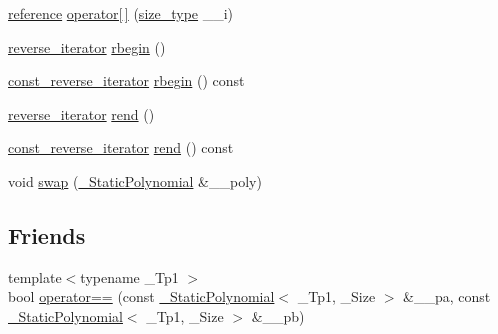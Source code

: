 \begin{DoxyCompactItemize}
\item 
\hyperlink{class____gnu__cxx_1_1__StaticPolynomial_a2416b66d254edf3e7118a8fb1204403f}{reference} \hyperlink{class____gnu__cxx_1_1__StaticPolynomial_ae898e5bc7bfb0e2c3a2e55ab873e80a7}{operator\mbox{[}$\,$\mbox{]}} (\hyperlink{class____gnu__cxx_1_1__StaticPolynomial_a0cc0aa4adab35686ef2474e07f511ff9}{size\+\_\+type} \+\_\+\+\_\+i)
\item 
\hyperlink{class____gnu__cxx_1_1__StaticPolynomial_a6313ff2d9e03c7911016595440c6a2ae}{reverse\+\_\+iterator} \hyperlink{class____gnu__cxx_1_1__StaticPolynomial_ad26b5676e30705aae3ff051f149e52df}{rbegin} ()
\item 
\hyperlink{class____gnu__cxx_1_1__StaticPolynomial_ae59b7bc5bdf7c61e562e8c4c8eaf904d}{const\+\_\+reverse\+\_\+iterator} \hyperlink{class____gnu__cxx_1_1__StaticPolynomial_a53306b159074b3eec382432137a4d297}{rbegin} () const
\item 
\hyperlink{class____gnu__cxx_1_1__StaticPolynomial_a6313ff2d9e03c7911016595440c6a2ae}{reverse\+\_\+iterator} \hyperlink{class____gnu__cxx_1_1__StaticPolynomial_a5f3ae3de860401093c3bbf768218db70}{rend} ()
\item 
\hyperlink{class____gnu__cxx_1_1__StaticPolynomial_ae59b7bc5bdf7c61e562e8c4c8eaf904d}{const\+\_\+reverse\+\_\+iterator} \hyperlink{class____gnu__cxx_1_1__StaticPolynomial_ad39f8cb28001cdfa18776c50160c5ce7}{rend} () const
\item 
void \hyperlink{class____gnu__cxx_1_1__StaticPolynomial_ae855be318bb050b83769beda4df280ec}{swap} (\hyperlink{class____gnu__cxx_1_1__StaticPolynomial}{\+\_\+\+Static\+Polynomial} \&\+\_\+\+\_\+poly)
\end{DoxyCompactItemize}
\subsection*{Friends}
\begin{DoxyCompactItemize}
\item 
{\footnotesize template$<$typename \+\_\+\+Tp1 $>$ }\\bool \hyperlink{class____gnu__cxx_1_1__StaticPolynomial_a851635a09c4301d11b439bfbb192df3a}{operator==} (const \hyperlink{class____gnu__cxx_1_1__StaticPolynomial}{\+\_\+\+Static\+Polynomial}$<$ \+\_\+\+Tp1, \+\_\+\+Size $>$ \&\+\_\+\+\_\+pa, const \hyperlink{class____gnu__cxx_1_1__StaticPolynomial}{\+\_\+\+Static\+Polynomial}$<$ \+\_\+\+Tp1, \+\_\+\+Size $>$ \&\+\_\+\+\_\+pb)
\end{DoxyCompactItemize}


